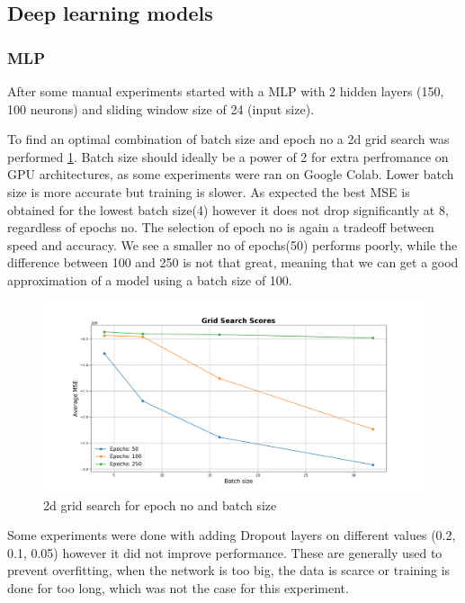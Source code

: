 \documentclass[12pt]{article}
\begin{document}
  \subsection{Deep learning models}
  \subsubsection{MLP}
  After some manual experiments started with a MLP with 2 hidden layers (150, 100 neurons) and sliding window
  size of 24 (input size). 

  To find an optimal combination of batch size and epoch no a 2d grid search was performed \ref{fig:epoch_batch}.
  Batch size should ideally be a power of 2 for extra perfromance on GPU architectures, as some 
  experiments were ran on Google Colab. Lower batch size is more accurate but training is slower\cite{batch_size}.
  As expected the best MSE is obtained for the lowest batch size(4) however it does not drop significantly
  at 8, regardless of epochs no. The selection of epoch no is again a tradeoff between speed and accuracy. 
  We see a smaller no of epochs(50) performs poorly, while the difference between 100 and 250 is not that great,
  meaning that we can get a good approximation of a model using a batch size of 100.

  \begin{figure}
    \includegraphics[width=\linewidth]{resources/mlp/epochs_batch.png}
    \caption{2d grid search for epoch no and batch size}
    \label{fig:epoch_batch}
  \end{figure}

  Some experiments were done with adding Dropout layers on different values (0.2, 0.1, 0.05) however it did 
  not improve performance. These are generally used to prevent overfitting, when the network is too big, the 
  data is scarce or training is done for too long\cite{dropout}, which was not the case for this experiment.
\end{document}
